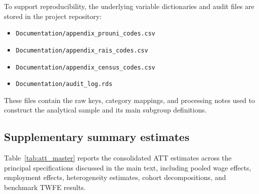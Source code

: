 To support reproducibility, the underlying variable dictionaries and audit files are stored in the project repository:
\begin{itemize}
    \item \texttt{Documentation/appendix\_prouni\_codes.csv}
    \item \texttt{Documentation/appendix\_rais\_codes.csv}
    \item \texttt{Documentation/appendix\_census\_codes.csv}
    \item \texttt{Documentation/audit\_log.rds}
\end{itemize}

These files contain the raw keys, category mappings, and processing notes used to construct the analytical sample and its main subgroup definitions.

\subsection{Supplementary summary estimates}
\label{app:summary_estimates}

Table~\ref{tab:att_master} reports the consolidated ATT estimates across the principal specifications discussed in the main text, including pooled wage effects, employment effects, heterogeneity estimates, cohort decompositions, and benchmark TWFE results.

